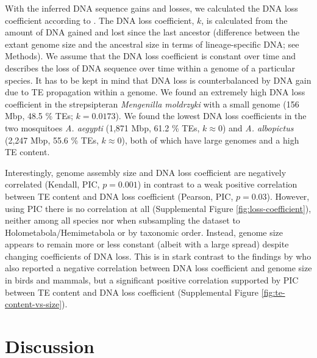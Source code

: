 With the inferred DNA sequence gains and losses, we calculated the DNA
loss coefficient according to \citet{Kapusta2017a}. The DNA loss
coefficient, \(k\), is calculated from the amount of DNA
gained and lost since the last ancestor (difference between the extant
genome size and the ancestral size in terms of lineage-specific DNA; see
Methods). We assume that the DNA loss coefficient is constant over time
and describes the loss of DNA sequence over time within a genome of a
particular species. It has to be kept in mind that DNA loss is
counterbalanced by DNA gain due to TE propagation within a genome. We
found an extremely high DNA loss coefficient in the strepsipteran
\emph{Mengenilla moldrzyki} with a small genome (156 Mbp, 48.5 \% TEs;
\(k = 0.0173\)). We found the lowest DNA loss coefficients in the
two mosquitoes \emph{A. aegypti} (1,871 Mbp, 61.2 \% TEs,
\(k \approx 0\)) and \emph{A. albopictus} (2,247 Mbp, 55.6 \% TEs,
\(k \approx 0\)), both of which have large genomes and a high TE
content.

Interestingly, genome assembly size and DNA loss coefficient are
negatively correlated (Kendall, PIC, \(p = 0.001\)) in contrast to
a weak positive correlation between TE content and DNA loss coefficient
(Pearson, PIC, \(p = 0.03\)). However, using PIC there is no
correlation at all (Supplemental Figure \ref{fig:loss-coefficient}), neither among all species
nor when subsampling the dataset to Holometabola/Hemimetabola or by
taxonomic order. Instead, genome size appears to remain more or less
constant (albeit with a large spread) despite changing coefficients of
DNA loss. This is in stark contrast to the findings by
\citet{Kapusta2017a} who also reported a negative correlation between DNA
loss coefficient and genome size in birds and mammals, but a significant
positive correlation supported by PIC between TE content and DNA loss
coefficient (Supplemental Figure \ref{fig:te-content-vs-size}).


\section{Discussion}

